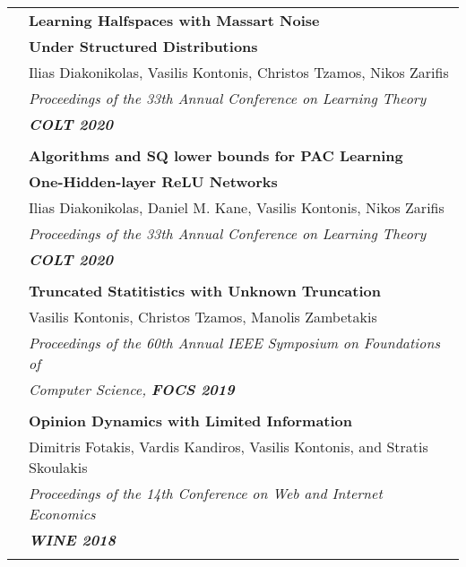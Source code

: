 \documentclass[letterpaper,11pt,oneside]{article}
\begin{document}
\begin{longtable}{@{} l l}
     &\textbf{Learning Halfspaces with Massart Noise}\\
     &\textbf{Under Structured Distributions}\\
     & Ilias Diakonikolas, Vasilis Kontonis, Christos Tzamos, Nikos Zarifis \\
     & \emph{Proceedings of the 33th Annual Conference on Learning Theory} \\
     & \emph{\textbf{COLT 2020}} \\
     & \\

     &\textbf{Algorithms and SQ lower bounds for PAC Learning} \\
     & \textbf{One-Hidden-layer ReLU Networks}\\
     & Ilias Diakonikolas, Daniel M. Kane, Vasilis Kontonis, Nikos Zarifis \\
     & \emph{Proceedings of the 33th Annual Conference on Learning Theory} \\
     & \emph{\textbf{COLT 2020}} \\
     & \\

     & \textbf{Truncated Statitistics with Unknown Truncation} \\
     & Vasilis Kontonis, Christos Tzamos, Manolis Zambetakis\\
     & \emph{Proceedings of the 60th Annual IEEE Symposium on Foundations of}\\
     & \emph{Computer Science, \textbf{FOCS 2019}}\\
     & \\


     & \textbf{Opinion Dynamics with Limited Information} \\
     & Dimitris Fotakis, Vardis Kandiros, Vasilis Kontonis, and Stratis Skoulakis\\
     & \emph{Proceedings of the 14th Conference on Web and Internet Economics} \\
     & \emph{\textbf{WINE 2018}} \\
     & \\


\end{longtable}
\end{document}
